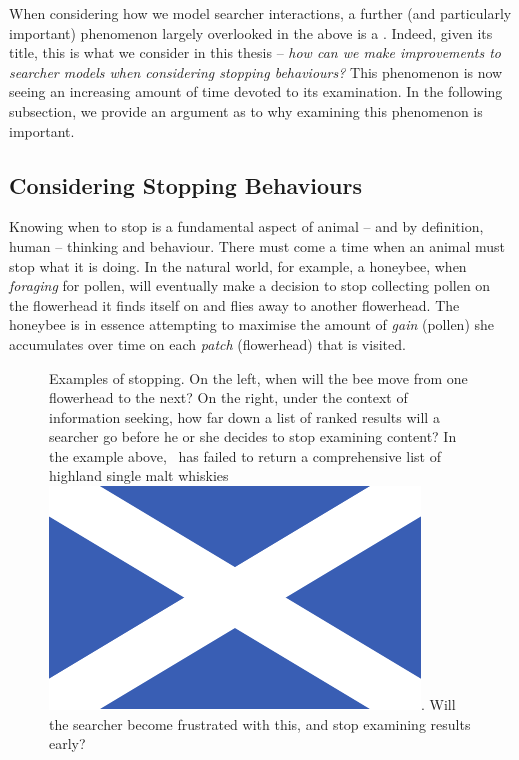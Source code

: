When considering how we model searcher interactions, a further (and particularly important) phenomenon largely overlooked in the above is a . Indeed, given its title, this is what we consider in this thesis -- \emph{how can we make improvements to searcher models when considering stopping behaviours?} This phenomenon is now seeing an increasing amount of time devoted to its examination. In the following subsection, we provide an argument as to why examining this phenomenon is important.

\subsection{Considering Stopping Behaviours}
Knowing when to stop is a fundamental aspect of animal -- and by definition, human -- thinking and behaviour. There must come a time when an animal must stop what it is doing. In the natural world, for example, a honeybee, when \emph{foraging} for pollen, will eventually make a decision to stop collecting pollen on the flowerhead it finds itself on and flies away to another flowerhead. The honeybee is in essence attempting to maximise the amount of \emph{gain} (pollen) she accumulates over time on each \emph{patch} (flowerhead) that is visited.

\begin{figure}[t!]
    \centering
    \caption[Animal and searcher stopping examples]{Examples of stopping. On the left, when will the bee move from one flowerhead to the next? On the right, under the context of information seeking, how far down a list of ranked results will a searcher go before he or she decides to stop examining content? In the example above, \searchlogo~has failed to return a comprehensive list of highland single malt whiskies~\includegraphics[height=\fontcharht\font`\d]{figures/ch0-saltire.pdf}. Will the searcher become frustrated with this, and stop examining results early?}
    \label{fig:ch1-stopping}
\end{figure}

